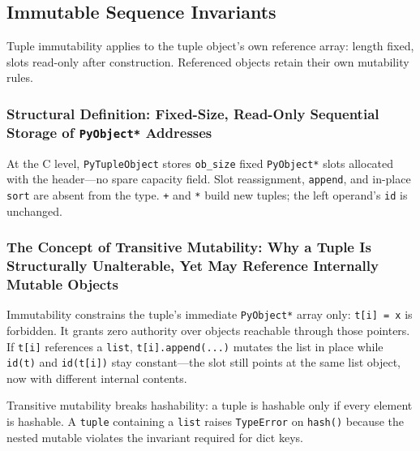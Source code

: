 \subsection{Immutable Sequence Invariants}

Tuple immutability applies to the tuple object's own reference array: length fixed, slots read-only after construction. Referenced objects retain their own mutability rules.

\subsubsection{Structural Definition: Fixed-Size, Read-Only Sequential Storage of \texttt{PyObject*} Addresses}

At the C level, \texttt{PyTupleObject} stores \texttt{ob\_size} fixed \texttt{PyObject*} slots allocated with the header---no spare capacity field. Slot reassignment, \texttt{append}, and in-place \texttt{sort} are absent from the type. \texttt{+} and \texttt{*} build new tuples; the left operand's \texttt{id} is unchanged.

\subsubsection{The Concept of Transitive Mutability: Why a Tuple Is Structurally Unalterable, Yet May Reference Internally Mutable Objects}

Immutability constrains the tuple's immediate \texttt{PyObject*} array only: \texttt{t[i] = x} is forbidden. It grants zero authority over objects reachable through those pointers. If \texttt{t[i]} references a \texttt{list}, \texttt{t[i].append(...)} mutates the list in place while \texttt{id(t)} and \texttt{id(t[i])} stay constant---the slot still points at the same list object, now with different internal contents.

Transitive mutability breaks hashability: a tuple is hashable only if every element is hashable. A \texttt{tuple} containing a \texttt{list} raises \texttt{TypeError} on \texttt{hash()} because the nested mutable violates the invariant required for dict keys.
